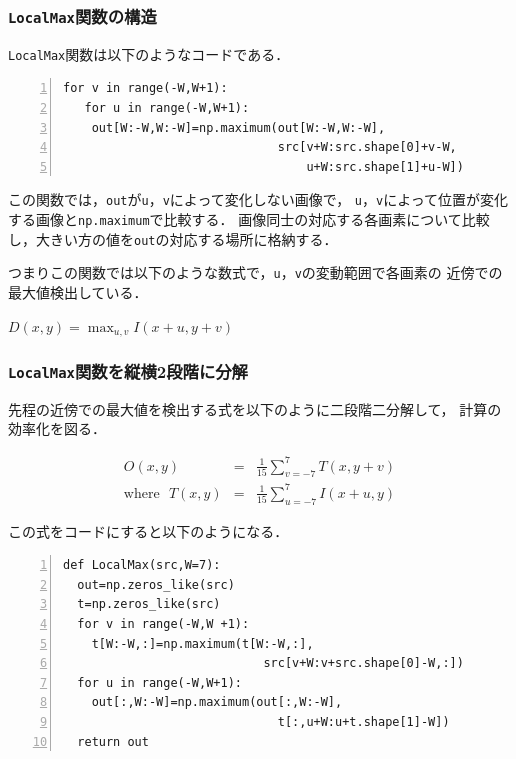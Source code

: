 \documentclass[autodetect-engine,dvi=dvipdfmx,ja=standard,
               a4j,11pt]{bxjsarticle}
\begin{document}
\subsubsection{\texttt{LocalMax}関数の構造}

\verb|LocalMax|関数は以下のようなコードである．

\begin{Verbatim}[numbers=left, xleftmargin=10mm, numbersep=6pt,
                    fontsize=\small, baselinestretch=0.8]
  for v in range(-W,W+1):
   for u in range(-W,W+1):
    out[W:-W,W:-W]=np.maximum(out[W:-W,W:-W],
                              src[v+W:src.shape[0]+v-W,
                                  u+W:src.shape[1]+u-W])
\end{Verbatim}

この関数では，\verb|out|が\verb|u|，\verb|v|によって変化しない画像で，
\verb|u|，\verb|v|によって位置が変化する画像と\verb|np.maximum|で比較する．
画像同士の対応する各画素について比較し，大きい方の値を\verb|out|の対応する場所に格納する．

つまりこの関数では以下のような数式で，\verb|u|，\verb|v|の変動範囲で各画素の
近傍での最大値検出している．

$D(x,y)=\max_{u,v}I(x+u,y+v)$

\subsubsection{\texttt{LocalMax}関数を縦横2段階に分解}

先程の近傍での最大値を検出する式を以下のように二段階二分解して，
計算の効率化を図る．

\begin{eqnarray}
O(x,y)&=&\frac{1}{15}\sum_{v=-7}^{7} T(x,y+v) \\
\mbox{where}~~~ T(x,y)&=&\frac{1}{15}\sum_{u=-7}^{7}I(x+u,y)
\end{eqnarray}

この式をコードにすると以下のようになる．

\begin{Verbatim}[numbers=left, xleftmargin=10mm, numbersep=6pt,
                    fontsize=\small, baselinestretch=0.8]
def LocalMax(src,W=7):
  out=np.zeros_like(src)
  t=np.zeros_like(src)
  for v in range(-W,W +1):
    t[W:-W,:]=np.maximum(t[W:-W,:],
                            src[v+W:v+src.shape[0]-W,:])
  for u in range(-W,W+1):
    out[:,W:-W]=np.maximum(out[:,W:-W],
                              t[:,u+W:u+t.shape[1]-W])
  return out
\end{Verbatim}
\end{document}
